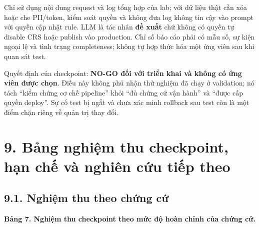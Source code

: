 \documentclass[
  10pt,
  a4paper,
]{article}
\begin{document}
Chỉ sử dụng nội dung request và log tổng hợp của lab; với dữ liệu thật
cần xóa hoặc che PII/token, kiểm soát quyền và không đưa log không tin
cậy vào prompt với quyền cập nhật rule. LLM là tác nhân \textbf{đề xuất}
chứ không có quyền tự disable CRS hoặc publish vào production. Chỉ số
báo cáo phải có mẫu số, sự kiện ngoại lệ và tình trạng completeness;
không tự hợp thức hóa một ứng viên sau khi quan sát test.

Quyết định của checkpoint: \textbf{NO-GO đối với triển khai và không có
ứng viên được chọn}. Điều này không phủ nhận thử nghiệm đã chạy ở
validation; nó tách ``kiểm chứng cơ chế pipeline'' khỏi ``đủ chứng cứ
vận hành'' và ``được cấp quyền deploy''. Sự cố test bị ngắt và chưa xác
minh rollback sau test còn là một điểm chặn riêng về quản trị thay đổi.

\section{9. Bảng nghiệm thu checkpoint, hạn chế và nghiên cứu tiếp
theo}\label{bux1ea3ng-nghiux1ec7m-thu-checkpoint-hux1ea1n-chux1ebf-vuxe0-nghiuxean-cux1ee9u-tiux1ebfp-theo}

\subsection{9.1. Nghiệm thu theo chứng
cứ}\label{nghiux1ec7m-thu-theo-chux1ee9ng-cux1ee9}

\textbf{Bảng 7. Nghiệm thu checkpoint theo mức độ hoàn chỉnh của chứng
cứ.}
\end{document}
